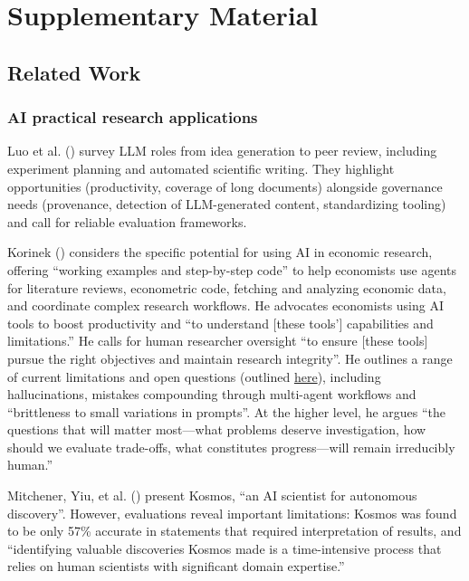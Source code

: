 \documentclass[
  11pt,
  letterpaper,
]{article}
\begin{document}
\section{Supplementary Material}\label{supplementary-material}

\subsection{Related Work}\label{sec-related-work}

\subsubsection{AI practical research
applications}\label{ai-practical-research-applications}

Luo et al. () survey LLM roles from idea
generation to peer review, including experiment planning and automated
scientific writing. They highlight opportunities (productivity, coverage
of long documents) alongside governance needs (provenance, detection of
LLM-generated content, standardizing tooling) and call for reliable
evaluation frameworks.

Korinek () considers the specific
potential for using AI in economic research, offering ``working examples
and step-by-step code'' to help economists use agents for literature
reviews, econometric code, fetching and analyzing economic data, and
coordinate complex research workflows. He advocates economists using AI
tools to boost productivity and ``to understand {[}these tools'{]}
capabilities and limitations.'' He calls for human researcher oversight
``to ensure {[}these tools{]} pursue the right objectives and maintain
research integrity''. He outlines a range of current limitations and
open questions (outlined
\href{https://docs.google.com/document/d/1CVNnG6Jw3gr1sbI9Z_vIIJ1BI9O-8-Eev6D2j22vaeg/edit?tab=t.0\#heading=h.9pcc2azfjlro}{here}),
including hallucinations, mistakes compounding through multi-agent
workflows and ``brittleness to small variations in prompts''. At the
higher level, he argues ``the questions that will matter most---what
problems deserve investigation, how should we evaluate trade-offs, what
constitutes progress---will remain irreducibly human.''

Mitchener, Yiu, et al. ()
present Kosmos, ``an AI scientist for autonomous discovery''. However,
evaluations reveal important limitations: Kosmos was found to be only
57\% accurate in statements that required interpretation of results, and
``identifying valuable discoveries Kosmos made is a time-intensive
process that relies on human scientists with significant domain
expertise.''
\end{document}
